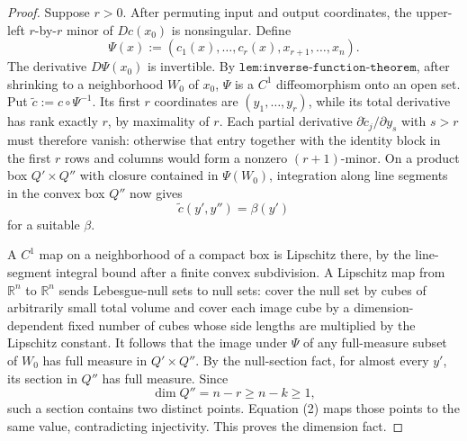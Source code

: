 \documentclass{article}
\begin{document}
\begin{proof}
Suppose \(r>0\).  After permuting input and output coordinates, the upper-left \(r\)-by-\(r\) minor of \(Dc(x_0)\) is nonsingular.  Define
\[
 \Psi(x):=(c_1(x),\ldots,c_r(x),x_{r+1},\ldots,x_n).
\]
The derivative \(D\Psi(x_0)\) is invertible.  By \(\texttt{lem:inverse-function-theorem}\), after shrinking to a neighborhood \(W_0\) of \(x_0\), \(\Psi\) is a \(C^1\) diffeomorphism onto an open set.  Put \(\widetilde c:=c\circ\Psi^{-1}\).  Its first \(r\) coordinates are \((y_1,\ldots,y_r)\), while its total derivative has rank exactly \(r\), by maximality of \(r\).  Each partial derivative \(\partial\widetilde c_j/\partial y_s\) with \(s>r\) must therefore vanish: otherwise that entry together with the identity block in the first \(r\) rows and columns would form a nonzero \((r+1)\)-minor.  On a product box \(Q'\times Q''\) with closure contained in \(\Psi(W_0)\), integration along line segments in the convex box \(Q''\) now gives
\[
 \widetilde c(y',y'')=\beta(y') \tag{2}
\]
for a suitable \(\beta\).

A \(C^1\) map on a neighborhood of a compact box is Lipschitz there, by the line-segment integral bound after a finite convex subdivision.  A Lipschitz map from \(\mathbb R^n\) to \(\mathbb R^n\) sends Lebesgue-null sets to null sets: cover the null set by cubes of arbitrarily small total volume and cover each image cube by a dimension-dependent fixed number of cubes whose side lengths are multiplied by the Lipschitz constant.  It follows that the image under \(\Psi\) of any full-measure subset of \(W_0\) has full measure in \(Q'\times Q''\).  By the null-section fact, for almost every \(y'\), its section in \(Q''\) has full measure.  Since
\[
 \dim Q''=n-r\geq n-k\geq1,
\]
such a section contains two distinct points.  Equation (2) maps those points to the same value, contradicting injectivity.  This proves the dimension fact.


\end{proof}
\end{document}
